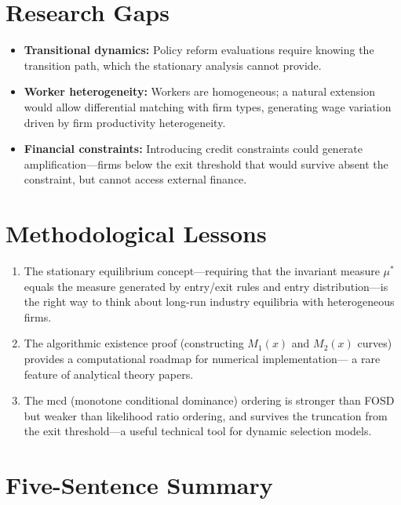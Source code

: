 \section{Research Gaps}

\begin{itemize}
  \item \textbf{Transitional dynamics:} Policy reform evaluations require
    knowing the transition path, which the stationary analysis cannot provide.
  \item \textbf{Worker heterogeneity:} Workers are homogeneous; a natural
    extension would allow differential matching with firm types, generating
    wage variation driven by firm productivity heterogeneity.
  \item \textbf{Financial constraints:} Introducing credit constraints could
    generate amplification---firms below the exit threshold that would survive
    absent the constraint, but cannot access external finance.
\end{itemize}

\section{Methodological Lessons}

\begin{enumerate}
  \item The stationary equilibrium concept---requiring that the invariant
    measure $\mu^*$ equals the measure generated by entry/exit rules and
    entry distribution---is the right way to think about long-run industry
    equilibria with heterogeneous firms.
  \item The algorithmic existence proof (constructing $M_1(x)$ and $M_2(x)$
    curves) provides a computational roadmap for numerical implementation---
    a rare feature of analytical theory papers.
  \item The mcd (monotone conditional dominance) ordering is stronger than
    FOSD but weaker than likelihood ratio ordering, and survives the truncation
    from the exit threshold---a useful technical tool for dynamic selection
    models.
\end{enumerate}

\section*{Five-Sentence Summary}

